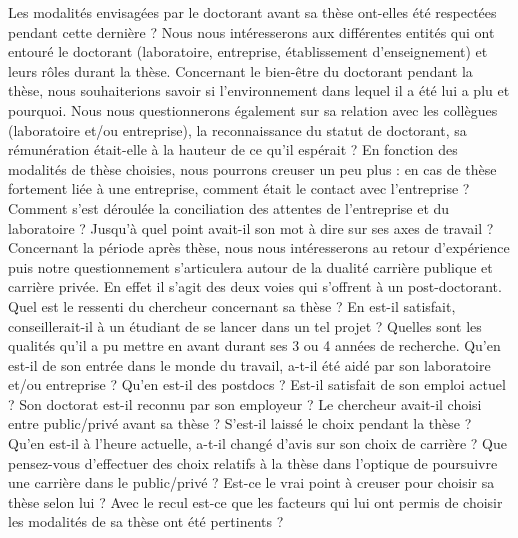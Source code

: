 \documentclass[12pt]{article}
\begin{document}
Les modalités envisagées par le doctorant avant sa thèse ont-elles été respectées pendant cette dernière ? Nous nous intéresserons aux différentes entités qui ont entouré le doctorant (laboratoire, entreprise, établissement d’enseignement) et leurs rôles durant la thèse. 
Concernant le bien-être du doctorant pendant la thèse, nous souhaiterions savoir si l’environnement dans lequel il a été lui a plu et pourquoi. Nous nous questionnerons également sur sa relation avec les collègues (laboratoire et/ou entreprise), la reconnaissance du statut de doctorant, sa rémunération était-elle à la hauteur de ce qu’il espérait ? 
En fonction des modalités de thèse choisies, nous pourrons creuser un peu plus : en cas de thèse fortement liée à une entreprise, comment était le contact avec l’entreprise ? Comment s’est déroulée la conciliation des attentes de l’entreprise et du laboratoire ? Jusqu'à quel point avait-il son mot à dire sur ses axes de travail ?
Concernant la période après thèse, nous nous intéresserons au retour d’expérience puis notre questionnement s’articulera autour de la dualité carrière publique et carrière privée. En effet il s'agit des deux voies qui s’offrent à un post-doctorant.
Quel est le ressenti du chercheur concernant sa thèse ? En est-il satisfait, conseillerait-il à un étudiant de se lancer dans un tel projet ? Quelles sont les qualités qu’il a pu mettre en avant durant ses 3 ou 4 années de recherche.
Qu'en est-il de son entrée dans le monde du travail, a-t-il été aidé par son laboratoire et/ou entreprise ? Qu'en est-il des postdocs ? Est-il satisfait de son emploi actuel ? Son doctorat est-il reconnu par son employeur ?
Le chercheur avait-il choisi entre public/privé avant sa thèse ? S'est-il laissé le choix pendant la thèse ? Qu'en est-il à l’heure actuelle, a-t-il changé d’avis sur son choix de carrière ? Que pensez-vous d'effectuer des choix relatifs à la thèse dans l'optique de poursuivre une carrière dans le public/privé ?
Est-ce le vrai point à creuser pour choisir sa thèse selon lui ? Avec le recul est-ce que les facteurs qui lui ont permis de choisir les modalités de sa thèse ont été pertinents ?


\end{document}

